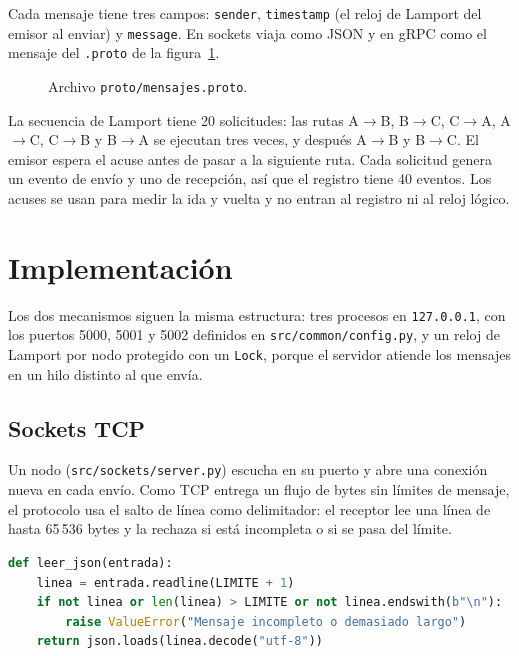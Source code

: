 \documentclass[11pt,a4paper]{article}
\begin{document}
Cada mensaje tiene tres campos: \texttt{sender}, \texttt{timestamp} (el reloj de Lamport
del emisor al enviar) y \texttt{message}. En sockets viaja como JSON y en gRPC como el
mensaje del \texttt{.proto} de la figura~\ref{lst:proto}.

\begin{figure}[htbp]
  
  \caption{Archivo \texttt{proto/mensajes.proto}.}
  \label{lst:proto}
\end{figure}

La secuencia de Lamport tiene 20 solicitudes: las rutas A$\rightarrow$B, B$\rightarrow$C,
C$\rightarrow$A, A$\rightarrow$C, C$\rightarrow$B y B$\rightarrow$A se ejecutan tres
veces, y después A$\rightarrow$B y B$\rightarrow$C. El emisor espera el acuse antes de
pasar a la siguiente ruta. Cada solicitud genera un evento de envío y uno de recepción,
así que el registro tiene 40 eventos. Los acuses se usan para medir la ida y vuelta y no
entran al registro ni al reloj lógico.

\section{Implementación}

Los dos mecanismos siguen la misma estructura: tres procesos en \texttt{127.0.0.1}, con los
puertos 5000, 5001 y 5002 definidos en \texttt{src/common/config.py}, y un reloj de Lamport
por nodo protegido con un \texttt{Lock}, porque el servidor atiende los mensajes en un hilo
distinto al que envía.

\subsection{Sockets TCP}

Un nodo (\texttt{src/sockets/server.py}) escucha en su puerto y abre una conexión nueva en
cada envío. Como TCP entrega un flujo de bytes sin límites de mensaje, el protocolo
usa el salto de línea como delimitador: el receptor lee una línea de hasta 65\,536 bytes y la
rechaza si está incompleta o si se pasa del límite.

\begin{lstlisting}[language=Python]
def leer_json(entrada):
    linea = entrada.readline(LIMITE + 1)
    if not linea or len(linea) > LIMITE or not linea.endswith(b"\n"):
        raise ValueError("Mensaje incompleto o demasiado largo")
    return json.loads(linea.decode("utf-8"))
\end{lstlisting}
\end{document}
